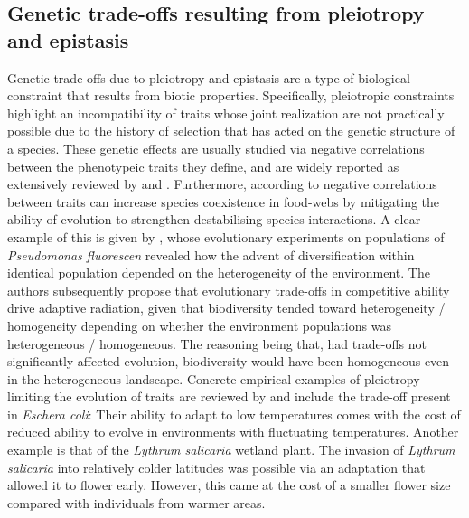 \documentclass[a4paper]{report}
\begin{document}
\subsection{Genetic trade-offs resulting from pleiotropy and epistasis \label{sec:genetic_tradeoffs}} Genetic trade-offs due to pleiotropy and epistasis are a type of biological constraint that results from biotic properties. Specifically, pleiotropic constraints highlight an incompatibility of traits whose joint realization are not practically possible due to the history of selection that has acted on the genetic structure of a species. These genetic effects are usually studied via negative correlations between the phenotypeic traits they define, and are widely reported as extensively reviewed by \citep{Walsh2009} and \citep{Hughes2018}. Furthermore, according to \citep{Hillerislambers2003} negative correlations between traits can increase species coexistence in food-webs by mitigating the ability of evolution to strengthen destabilising species interactions. A clear example of this is given by \citep{Rainey1998}, whose evolutionary experiments on populations of \textit{Pseudomonas fluorescen} revealed how the advent of diversification within identical population depended on the heterogeneity of the environment. The authors subsequently propose that evolutionary trade-offs in competitive ability drive adaptive radiation, given that biodiversity tended toward heterogeneity / homogeneity depending on whether the environment populations was heterogeneous / homogeneous. The reasoning being that, had trade-offs not significantly affected evolution, biodiversity would have been homogeneous even in the heterogeneous landscape. Concrete empirical examples of pleiotropy limiting the evolution of traits are reviewed by \citep{hoffmann2014evolutionary} and include the trade-off present in \textit{Eschera coli}: Their ability to adapt to low temperatures comes with the cost of reduced ability to evolve in environments with fluctuating temperatures. Another example is that of the \textit{Lythrum salicaria} wetland plant. The invasion of \textit{Lythrum salicaria} into relatively colder latitudes was possible via an adaptation that allowed it to flower early. However, this came at the cost of a smaller flower size compared with individuals from warmer areas.\\
\end{document}
